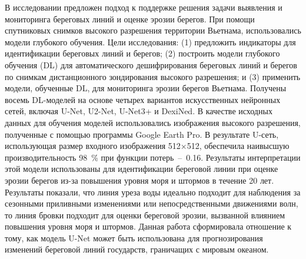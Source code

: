 \documentclass[732,14pt,final]{studrep}
\begin{document}
В исследовании \cite{b1} предложен подход к поддержке решения задачи выявления и мониторинга береговых линий и оценке эрозии берегов. При помощи спутниковых снимков высокого разрешения территории Вьетнама, использовались модели глубокого обучения. Цели исследования: (1) предложить индикаторы для идентификации береговых линий и берегов; (2) построить модели глубокого обучения (DL) для автоматического дешифрирования береговых линий и берегов по снимкам дистанционного зондирования высокого разрешения; и (3) применить модели, обученные DL, для мониторинга эрозии берегов Вьетнама. Получены восемь DL-моделей на основе четырех вариантов искусственных нейронных сетей, включая U-Net, U2-Net, U-Net3+ и DexiNed. В качестве исходных данных для обучения моделей использовались изображения высокого разрешения, полученные с помощью программы Google Earth Pro. В результате U-сеть, использующая размер входного изображения 512×512, обеспечила наивысшую производительность 98~\% при функции потерь~--~0.16. Результаты интерпретации этой модели использованы для идентификации береговой линии при оценке эрозии берегов из-за повышения уровня моря и штормов в течение 20 лет. Результаты показали, что линия уреза воды идеально подходит для наблюдения за сезонными приливными изменениями или непосредственными движениями волн, то линия бровки подходит для оценки береговой эрозии, вызванной влиянием повышения уровня моря и штормов. Данная работа сформировала отношение к тому, как модель U-Net может быть использована для прогнозирования изменений береговой линий государств, граничащих с мировым океаном.
\end{document}
